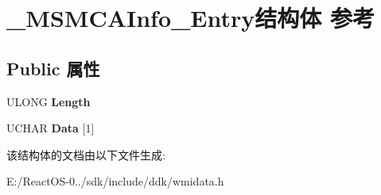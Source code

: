 \hypertarget{struct___m_s_m_c_a_info___entry}{}\section{\+\_\+\+M\+S\+M\+C\+A\+Info\+\_\+\+Entry结构体 参考}
\label{struct___m_s_m_c_a_info___entry}
\subsection*{Public 属性}
\begin{DoxyCompactItemize}
\item 
\mbox{\label{struct___m_s_m_c_a_info___entry_ad82e3967f76cc6127cf28641306ad528}} 
U\+L\+O\+NG {\bfseries Length}
\item 
\mbox{\label{struct___m_s_m_c_a_info___entry_a66077891c9dc094bc227debb53268b6f}} 
U\+C\+H\+AR {\bfseries Data} \mbox{[}1\mbox{]}
\end{DoxyCompactItemize}


该结构体的文档由以下文件生成\+:\begin{DoxyCompactItemize}
\item 
E\+:/\+React\+O\+S-\/0../sdk/include/ddk/wmidata.\+h\end{DoxyCompactItemize}

